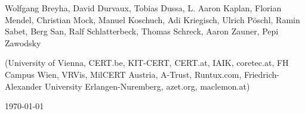 \begin{titlepage}
  \begin{center}
    \iftoggle{ereader}{%
      \texttt{[image: img/logo]}
      \vspace{12pt}
    }{%
      \texttt{[image: img/logo]}
      \vspace{45pt}
    }
    \iftoggle{ereader}{%
      \HorRule
      \smallskip
      {\fontsize{20}{20} \bfseries Applied Crypto Hardening\par}
      \medskip
    }{%
      \HorRule
      \medskip
      {\fontsize{35}{36} \bfseries Applied Crypto Hardening\par}
      \bigskip
    }
  \end{center}
  \begin{flushleft}
    {\large \color{intersectgreen} Wolfgang Breyha, David Durvaux, Tobias
      Dussa, L. Aaron Kaplan, Florian Mendel, Christian Mock, Manuel Koschuch,
      Adi Kriegisch, Ulrich P\"oschl, Ramin Sabet, Berg San, Ralf
      Schlatterbeck, Thomas Schreck, Aaron Zauner, Pepi Zawodsky
      \par}
    \iftoggle{ereader}{\smallskip}{\bigskip}
    (University of Vienna, CERT.be, KIT-CERT, CERT.at, IAIK, coretec.at, FH
    Campus Wien, VRVis, MilCERT Austria, A-Trust, Runtux.com,
    Friedrich-Alexander University Erlangen-Nuremberg, azet.org, maclemon.at)
  \end{flushleft}
  \iftoggle{ereader}{}{\medskip}
  \HorRule
  \begin{center}
    \today
  \end{center}
\end{titlepage}
